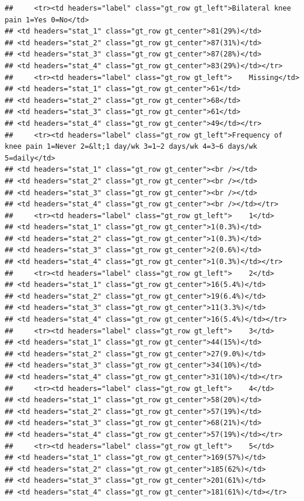 \documentclass{article}
\begin{document}
\begin{verbatim}
##     <tr><td headers="label" class="gt_row gt_left">Bilateral knee pain 1=Yes 0=No</td>
## <td headers="stat_1" class="gt_row gt_center">81(29%)</td>
## <td headers="stat_2" class="gt_row gt_center">87(31%)</td>
## <td headers="stat_3" class="gt_row gt_center">87(28%)</td>
## <td headers="stat_4" class="gt_row gt_center">83(29%)</td></tr>
##     <tr><td headers="label" class="gt_row gt_left">    Missing</td>
## <td headers="stat_1" class="gt_row gt_center">61</td>
## <td headers="stat_2" class="gt_row gt_center">68</td>
## <td headers="stat_3" class="gt_row gt_center">61</td>
## <td headers="stat_4" class="gt_row gt_center">49</td></tr>
##     <tr><td headers="label" class="gt_row gt_left">Frequency of knee pain 1=Never 2=&lt;1 day/wk 3=1~2 days/wk 4=3~6 days/wk 5=daily</td>
## <td headers="stat_1" class="gt_row gt_center"><br /></td>
## <td headers="stat_2" class="gt_row gt_center"><br /></td>
## <td headers="stat_3" class="gt_row gt_center"><br /></td>
## <td headers="stat_4" class="gt_row gt_center"><br /></td></tr>
##     <tr><td headers="label" class="gt_row gt_left">    1</td>
## <td headers="stat_1" class="gt_row gt_center">1(0.3%)</td>
## <td headers="stat_2" class="gt_row gt_center">1(0.3%)</td>
## <td headers="stat_3" class="gt_row gt_center">2(0.6%)</td>
## <td headers="stat_4" class="gt_row gt_center">1(0.3%)</td></tr>
##     <tr><td headers="label" class="gt_row gt_left">    2</td>
## <td headers="stat_1" class="gt_row gt_center">16(5.4%)</td>
## <td headers="stat_2" class="gt_row gt_center">19(6.4%)</td>
## <td headers="stat_3" class="gt_row gt_center">11(3.3%)</td>
## <td headers="stat_4" class="gt_row gt_center">16(5.4%)</td></tr>
##     <tr><td headers="label" class="gt_row gt_left">    3</td>
## <td headers="stat_1" class="gt_row gt_center">44(15%)</td>
## <td headers="stat_2" class="gt_row gt_center">27(9.0%)</td>
## <td headers="stat_3" class="gt_row gt_center">34(10%)</td>
## <td headers="stat_4" class="gt_row gt_center">31(10%)</td></tr>
##     <tr><td headers="label" class="gt_row gt_left">    4</td>
## <td headers="stat_1" class="gt_row gt_center">58(20%)</td>
## <td headers="stat_2" class="gt_row gt_center">57(19%)</td>
## <td headers="stat_3" class="gt_row gt_center">68(21%)</td>
## <td headers="stat_4" class="gt_row gt_center">57(19%)</td></tr>
##     <tr><td headers="label" class="gt_row gt_left">    5</td>
## <td headers="stat_1" class="gt_row gt_center">169(57%)</td>
## <td headers="stat_2" class="gt_row gt_center">185(62%)</td>
## <td headers="stat_3" class="gt_row gt_center">201(61%)</td>
## <td headers="stat_4" class="gt_row gt_center">181(61%)</td></tr>

\end{verbatim}
\end{document}
